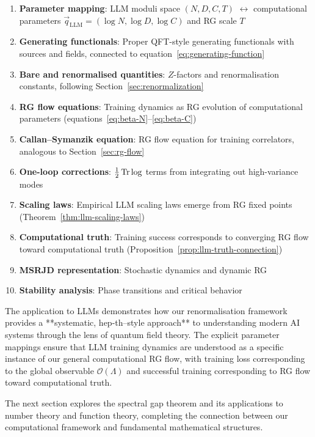 \begin{enumerate}
\item \textbf{Parameter mapping}: LLM moduli space $(N,D,C,T)$ $\leftrightarrow$ computational parameters $\vec{q}_{\text{LLM}} = (\log N, \log D, \log C)$ and RG scale $T$
\item \textbf{Generating functionals}: Proper QFT-style generating functionals with sources and fields, connected to equation~\eqref{eq:generating-function}
\item \textbf{Bare and renormalised quantities}: $Z$-factors and renormalisation constants, following Section~\ref{sec:renormalization}
\item \textbf{RG flow equations}: Training dynamics as RG evolution of computational parameters (equations~\eqref{eq:beta-N}--\eqref{eq:beta-C})
\item \textbf{Callan--Symanzik equation}: RG flow equation for training correlators, analogous to Section~\ref{sec:rg-flow}
\item \textbf{One-loop corrections}: $\tfrac12\Tr\log$ terms from integrating out high-variance modes
\item \textbf{Scaling laws}: Empirical LLM scaling laws emerge from RG fixed points (Theorem~\ref{thm:llm-scaling-laws})
\item \textbf{Computational truth}: Training success corresponds to converging RG flow toward computational truth (Proposition~\ref{prop:llm-truth-connection})
\item \textbf{MSRJD representation}: Stochastic dynamics and dynamic RG
\item \textbf{Stability analysis}: Phase transitions and critical behavior
\end{enumerate}

The application to LLMs demonstrates how our renormalisation framework provides a **systematic, hep-th–style approach** to understanding modern AI systems through the lens of quantum field theory. The explicit parameter mappings ensure that LLM training dynamics are understood as a specific instance of our general computational RG flow, with training loss corresponding to the global observable $\mathcal{O}(\Lambda)$ and successful training corresponding to RG flow toward computational truth.

The next section explores the spectral gap theorem and its applications to number theory and function theory, completing the connection between our computational framework and fundamental mathematical structures.